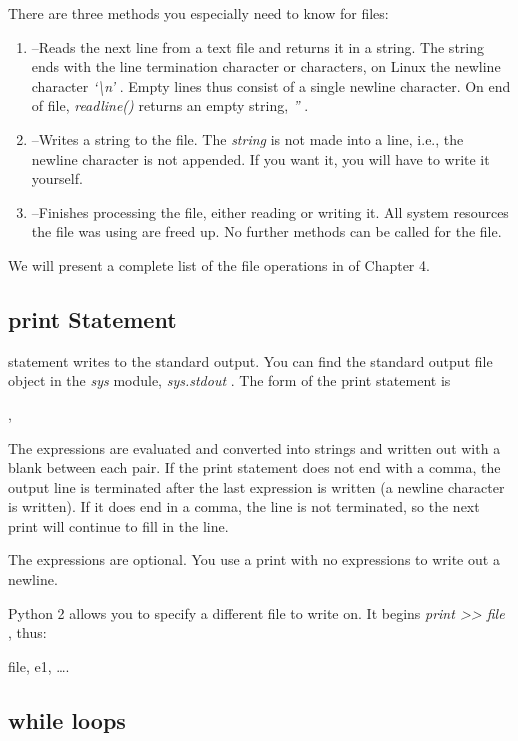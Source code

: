 There are three methods you
especially need to know for files:

\begin{enumerate}

\item
   --Reads the
  next line from a text file and returns it in a string. The string ends
  with the line termination character or characters, on Linux the
  newline character \emph{`\textbackslash{}n'} . Empty lines thus
  consist of a single newline character. On end of file,
  \emph{readline()} returns an empty string, \emph{''} .
\item
   --Writes
  a string to the file. The \emph{string} is not made into a line, i.e.,
  the newline character is not appended. If you want it, you will have
  to write it yourself.
\item
   --Finishes
  processing the file, either reading or writing it. All system
  resources the file was using are freed up. No further methods can be
  called for the file.
\end{enumerate}

We will present a complete list of
the file operations in \href{chap4.html\#22958}{} of Chapter 4.

\subsection{print Statement}
\label{print-statement}

 statement writes
to the standard output. You can find the standard output file object in
the \emph{sys} module, \emph{sys.stdout} . The form of the print
statement is



 ,

The expressions are evaluated and
converted into strings and written out with a blank between each pair.
If the print statement does not end with a comma, the output line is
terminated after the last expression is written (a newline character is
written). If it does end in a comma, the line is not terminated, so the
next print will continue to fill in the line.

The expressions are optional. You
use a print with no expressions to write out a newline.

Python 2 allows you to specify a
different file to write on. It begins \emph{print
\textgreater{}\textgreater{} file} , thus:


file, e1, \ldots{}.

\subsection{while loops}
\label{while-loops}

